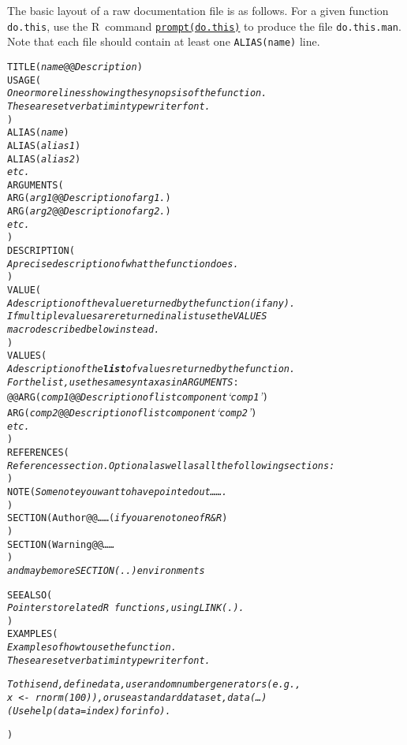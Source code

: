 \documentclass[a4paper,11pt]{article}
\newenvironment{display}[0]%
 {\begin{list}{}{\setlength{\leftmargin}{30pt}}\item}%
 {\end{list}}
\newcommand{\R}{\textsc{R}}
\begin{document}
The basic layout of a raw documentation file is as follows.
For a given function \texttt{do.this}, use the \R\ command
\underline{\texttt{prompt(do.this)}} to produce the file \texttt{do.this.man}.
Note that each file should contain at least one \texttt{ALIAS(name)} line.
\begin{display}
\begin{alltt}
TITLE(\textit{name} @@ \textit{Description})
USAGE(
\textit{One or more lines showing the synopsis of the function.
These are set verbatim in typewriter font.}
)
ALIAS(\textit{name})
ALIAS(\textit{alias 1})
ALIAS(\textit{alias 2})
\textit{etc.}
ARGUMENTS(
ARG(\textit{arg1} @@ \textit{Description of arg1.})
ARG(\textit{arg2} @@ \textit{Description of arg2.})
\textit{etc.}
)
DESCRIPTION(
\textit{A precise description of what the function does.}
)
VALUE(
\textit{A description of the value returned by the function (if any).
If multiple values are returned in a list use the \texttt{VALUES}
macro described below instead.}
)
VALUES(
{\textit{A description of the \textbf{list} of values returned by the function.
For the list, use the same syntax as in ARGUMENTS}:
@@\samepage}\pagebreak[3]
ARG(\textit{comp1} @@ \textit{Description of list component `comp1'})
ARG(\textit{comp2} @@ \textit{Description of list component `comp2'})
\textit{etc.}
)
REFERENCES(
\textit{References section.  Optional as well as all the following sections:}
)
NOTE( \textit{Some note you want to have pointed out\dots\dots.}
)
SECTION(Author @@ \dots\dots {\small(\textit{if you are not one of R\&R})}
)
SECTION(Warning @@ \textit{\dots\dots}
)
\textit{ and maybe more \texttt{SECTION(..)}  environments}

SEEALSO(
\textit{Pointers to related \R\ functions, using \texttt{LINK(.)}.}
)
EXAMPLES(
\textit{Examples of how to use the function.
These are set verbatim in typewriter font.}

\textit{To this end, define data, use random number generators (e.g.,
  \texttt{x <- rnorm(100)}), or use a standard dataset, \texttt{data(\dots)}
  (Use \texttt{help(data=index)} for info).}

)
\end{alltt}
\end{display}

\bigskip
\pagebreak[3]
\pagebreak[4]%
\end{document}
